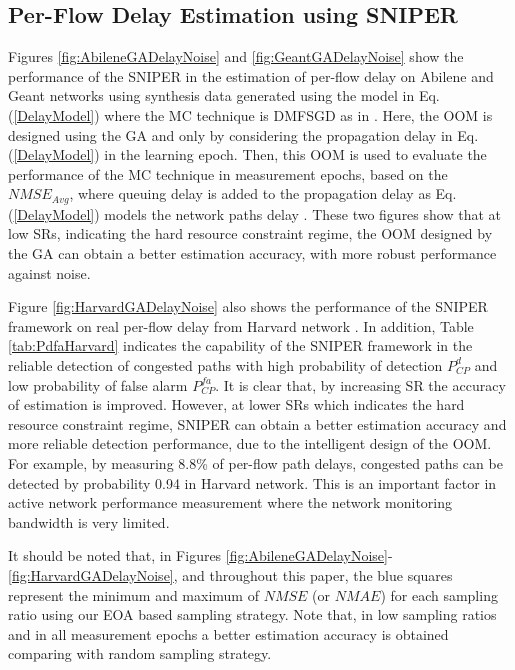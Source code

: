 \subsection{Per-Flow Delay Estimation using SNIPER}
Figures \ref{fig:AbileneGADelayNoise} and \ref{fig:GeantGADelayNoise} show the performance of the SNIPER in the estimation of per-flow delay on Abilene and Geant networks using synthesis data generated using the model in Eq.(\ref{DelayModel}) where the MC technique is DMFSGD as in \cite{YLiao:2011}. Here, the OOM is designed using the GA and only by considering the propagation delay in Eq.(\ref{DelayModel}) in the learning epoch. Then, this OOM is used to evaluate the performance of the MC technique in measurement epochs, based on the $NMSE_{Avg}$, where queuing delay is added to the propagation delay as Eq.(\ref{DelayModel}) models the network paths delay \cite{Pietro:2008}. These two figures show that at low SRs, indicating the hard resource constraint regime, the OOM designed by the GA can obtain a better estimation accuracy, with more robust performance against noise.

Figure \ref{fig:HarvardGADelayNoise} also shows the performance of the SNIPER framework on real per-flow delay from Harvard network \cite{JLedlie:2007}. In addition, Table \ref{tab:PdfaHarvard} indicates the capability of the SNIPER framework in the reliable detection of congested paths with high probability of detection $P^{d}_{CP}$ and low probability of false alarm $P^{fa}_{CP}$. It is clear that, by increasing SR the accuracy of estimation is improved. However, at lower SRs which indicates the hard resource constraint regime, SNIPER can obtain a better estimation accuracy and more reliable detection performance, due to the intelligent design of the OOM. For example, by measuring 8.8\% of per-flow path delays, congested paths can be detected by probability 0.94 in Harvard network. This is an important factor in active network performance measurement where the network monitoring bandwidth is very limited.

It should be noted that, in Figures \ref{fig:AbileneGADelayNoise}-\ref{fig:HarvardGADelayNoise}, and throughout this paper, the blue squares represent the minimum and maximum of $NMSE$ (or $NMAE$) for each sampling ratio using our EOA based sampling strategy. Note that, in low sampling ratios and in all measurement epochs a better estimation accuracy is obtained comparing with random sampling strategy. 

